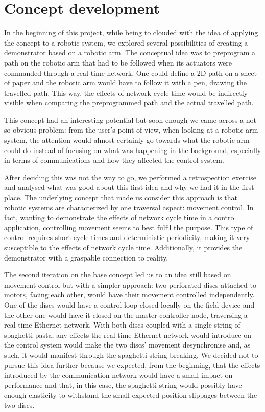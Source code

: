 \section{Concept development}

In the beginning of this project, while being to clouded with the idea of applying the concept to a robotic system, we explored several possibilities of creating a demonstrator based on a robotic arm.
The conceptual idea was to preprogram a path on the robotic arm that had to be followed when its actuators were commanded through a real-time network.
One could define a 2D path on a sheet of paper and the robotic arm would have to follow it with a pen, drawing the travelled path.
This way, the effects of network cycle time would be indirectly visible when comparing the preprogrammed path and the actual travelled path.

This concept had an interesting potential but soon enough we came across a not so obvious problem: from the user's point of view, when looking at a robotic arm system, the attention would almost certainly go towards what the robotic arm could do instead of focusing on what was happening in the background, especially in terms of communications and how they affected the control system.

After deciding this was not the way to go, we performed a retrospection exercise and analysed what was good about this first idea and why we had it in the first place.
The underlying concept that made us consider this approach is that robotic systems are characterized by one traversal aspect: movement control.
In fact, wanting to demonstrate the effects of network cycle time in a control application, controlling movement seems to best fulfil the purpose.
This type of control requires short cycle times and deterministic periodicity, making it very susceptible to the effects of network cycle time.
Additionally, it provides the demonstrator with a graspable connection to reality.

The second iteration on the base concept led us to an idea still based on movement control but with a simpler approach: two perforated discs attached to motors, facing each other, would have their movement controlled independently.
One of the discs would have a control loop closed locally on the field device and the other one would have it closed on the master controller node, traversing a real-time Ethernet network.
With both discs coupled with a single string of spaghetti pasta, any effects the real-time Ethernet network would introduce on the control system would make the two discs' movement desynchronise and, as such, it would manifest through the spaghetti string breaking.
We decided not to pursue this idea further because we expected, from the beginning, that the effects introduced by the communication network would have a small impact on performance and that, in this case, the spaghetti string would possibly have enough elasticity to withstand the small expected position slippages between the two discs.

